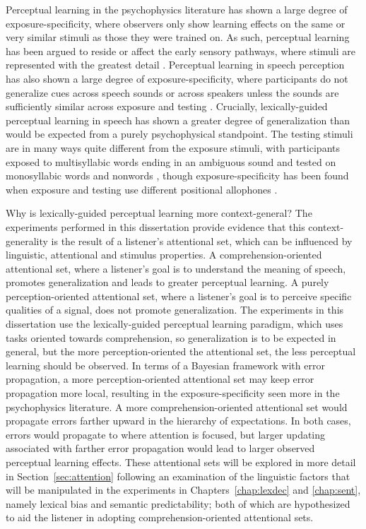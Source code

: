 Perceptual learning in the psychophysics literature has shown a large degree of exposure-specificity, where observers only show learning effects on the same or very similar stimuli as those they were trained on. 
As such, perceptual learning has been argued to reside or affect the early sensory pathways, where stimuli are represented with the greatest detail \citep{Gilbert2001}.  
Perceptual learning in speech perception has also shown a large degree of exposure-specificity, where participants do not generalize cues across speech sounds \citep{Reinisch2014} or across speakers unless the sounds are sufficiently similar across exposure and testing \citep{Eisner2005, Kraljic2005, Kraljic2007, Reinisch2013a}.  
Crucially, lexically-guided perceptual learning in speech has shown a greater degree of generalization than would be expected from a purely psychophysical standpoint.  
The testing stimuli are in many ways quite different from the exposure stimuli, with participants exposed to multisyllabic words ending in an ambiguous sound and tested on monosyllabic words \citep{Reinisch2013} and nonwords \citep{Norris2003, Kraljic2005}, though exposure-specificity has been found when exposure and testing use different positional allophones \citep{Mitterer2013}.

Why is lexically-guided perceptual learning more context-general?
The experiments performed in this dissertation provide evidence that this context-generality is the result of a listener's attentional set, which can be influenced by linguistic, attentional and stimulus properties.
A comprehension-oriented attentional set, where a listener's goal is to understand the meaning of speech, promotes generalization and leads to greater perceptual learning.  
A purely perception-oriented attentional set, where a listener's goal is to perceive specific qualities of a signal, does not promote generalization.
The experiments in this dissertation use the lexically-guided perceptual learning paradigm, which uses tasks oriented towards comprehension, so generalization is to be expected in general, but the more perception-oriented the attentional set, the less perceptual learning should be observed.
In terms of a Bayesian framework with error propagation, a more perception-oriented attentional set may keep error propagation more local, resulting in the exposure-specificity seen more in the psychophysics literature.
A more comprehension-oriented attentional set would propagate errors farther upward in the hierarchy of expectations.
In both cases, errors would propagate to where attention is focused, but larger updating associated with farther error propagation would lead to larger observed perceptual learning effects.
These attentional sets will be explored in more detail in Section~\ref{sec:attention} following an examination of the linguistic factors that will be manipulated in the experiments in Chapters~\ref{chap:lexdec} and \ref{chap:sent}, namely lexical bias and semantic predictability; both of which are hypothesized to aid the listener in adopting comprehension-oriented attentional sets.

